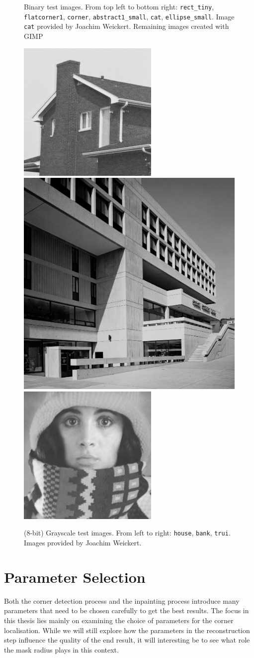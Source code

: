 \begin{figure}[h]
    \caption{Binary test images. From top left to bottom right: \texttt{rect\_tiny},
    \texttt{flatcorner1}, \texttt{corner}, \texttt{abstract1\_small}, \texttt{cat},
\texttt{ellipse\_small}. Image \texttt{cat} provided by Joachim Weickert. Remaining images created
with GIMP}\label{fig:BinaryImages}
\end{figure}
\begin{figure}[h]
    \centering
    \includegraphics[width=0.3\linewidth]{../../images/grey/house.png}
    \includegraphics[width=0.3\linewidth]{../../images/grey/bank.png}
    \includegraphics[width=0.3\linewidth]{../../images/grey/trui.png}
    \caption{(8-bit) Grayscale test images. From left to right: \texttt{house}, \texttt{bank},
    \texttt{trui}. Images provided by Joachim Weickert.}\label{fig:GreyImages}
\end{figure}
\section{Parameter Selection}\label{sec:ParameterSelection}
Both the corner detection process and the inpainting process introduce many parameters that need to
be chosen carefully to get the best results. The focus in this thesis lies mainly on examining the
choice of parameters for the corner localisation. While we will still explore how the parameters in
the reconstruction step influence the quality of the end result, it will interesting be to
see what role the mask radius plays in this context.

